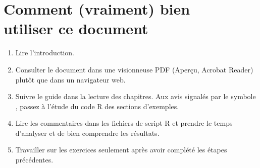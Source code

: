 \chapter*{Comment (vraiment) bien \\ utiliser ce document}

\begin{enumerate}
\item Lire l'introduction.
\item Consulter le document dans une visionneuse PDF (Aperçu, Acrobat
  Reader) plutôt que dans un navigateur web.
\item Suivre le guide dans la lecture des chapitres. Aux avis signalés
  par le symbole {\faMapSigns}, passez à l'étude du code R des
  sections d'exemples.
\item Lire les commentaires dans les fichiers de script R et prendre
  le temps d'analyser et de bien comprendre les résultats.
\item Travailler sur les exercices seulement après avoir complété les
  étapes précédentes.
\end{enumerate}

